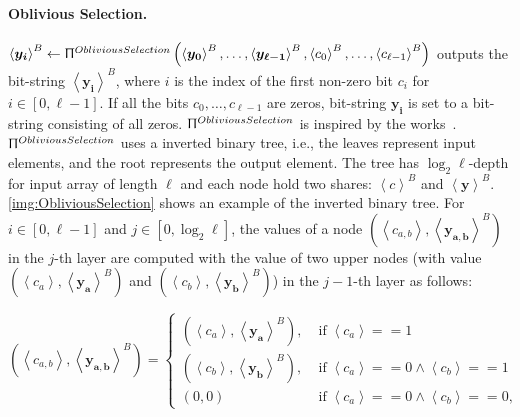 
\paragraph{Oblivious Selection.}
\label{para:ObliviousSelection}
$\left\langle \boldsymbol{y_i}\right\rangle ^{B}\gets \Uppi^{ObliviousSelection}\left(\left\langle \boldsymbol{y_0}\right\rangle^{B} ,\ldots,\left\langle \boldsymbol{y_{\ell-1}}\right\rangle^{B},\left\langle c_0\right\rangle ^B,\ldots,\left\langle c_{\ell-1}\right\rangle ^B\right) $ outputs the bit-string $\left\langle \boldsymbol{y_i}\right\rangle ^B$, where $i$ is the index of the first non-zero bit $c_{i}$ for $i\in \left[0,\ell-1\right] $. If all the bits $c_0, \ldots, c_{\ell-1}$ are zeros, bit-string $\boldsymbol{y_i} $ is set to a bit-string consisting of all zeros.
$\Uppi^{ObliviousSelection}$ is inspired by the works~\cite{jarvinen2019pilot,mohassel2020practical}. $\Uppi^{ObliviousSelection}$ uses a inverted binary tree, i.e., the leaves represent input elements, and the root represents the output element. The tree has $\log_2{\ell}$-depth for input array of length $\ell$ and each node hold two shares: $\left\langle c\right\rangle^B $ and $\left\langle \boldsymbol{y}\right\rangle ^{B} $. \autoref{img:ObliviousSelection} shows an example of the inverted binary tree. For $i\in \left[0,\ell-1\right] $ and $j\in \left[0,\log_2 \ell\right] $, the values of a node $\left(\left\langle c_{a,b}\right\rangle , \left\langle \boldsymbol{y_{a,b}}\right\rangle ^{B}\right) $ in the $j$-th layer are computed with the value of two upper nodes (with value $\left(\left\langle c_{a}\right\rangle , \left\langle \boldsymbol{y_{a}}\right\rangle ^{B}\right)$  and $\left(\left\langle c_{b}\right\rangle , \left\langle \boldsymbol{y_{b}}\right\rangle ^{B}\right) $) in the $j-1$-th layer as follows:

\begin{equation}
    \left(\left\langle c_{a,b}\right\rangle , \left\langle \boldsymbol{y_{a,b}}\right\rangle ^{B}\right)=
    \begin{cases}
        \left(\left\langle c_{a}\right\rangle , \left\langle \boldsymbol{y_{a}}\right\rangle ^{B}\right) , & \operatorname{ if } \left\langle c_{a}\right\rangle ==1                                                  \\
        \left(\left\langle c_{b}\right\rangle , \left\langle \boldsymbol{y_{b}}\right\rangle ^{B}\right) , & \operatorname{ if } \left\langle c_{a}\right\rangle == 0 \land      \left\langle c_{b}\right\rangle ==1  \\
        \left(0,0\right)                                                                                   & \operatorname{ if } \left\langle c_{a}\right\rangle == 0 \land      \left\langle c_{b}\right\rangle ==0,
    \end{cases}
\end{equation}

